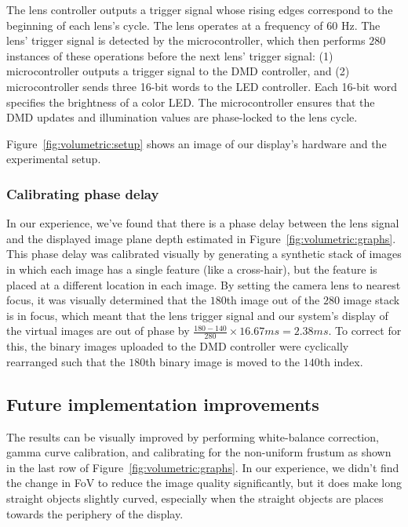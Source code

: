 The lens controller outputs a trigger signal whose rising edges correspond to the beginning of each lens's cycle. The lens operates at a frequency of 60 Hz. The lens' trigger signal is detected by the microcontroller, which then performs $280$ instances of these operations before the next lens' trigger signal: (1) microcontroller outputs a trigger signal to the DMD controller, and (2) microcontroller sends three 16-bit words to the LED controller. Each 16-bit word specifies the brightness of a color LED. The microcontroller ensures that the DMD updates and illumination values are phase-locked to the lens cycle. 

Figure~\ref{fig:volumetric:setup} shows an image of our display's hardware and the experimental setup. 

\subsubsection{Calibrating phase delay}
In our experience, we've found that there is a phase delay between the lens signal and the displayed image plane depth estimated in Figure~\ref{fig:volumetric:graphs}. This phase delay was calibrated visually by generating a synthetic stack of images in which each image has a single feature (like a cross-hair), but the feature is placed at a different location in each image. By setting the camera lens to nearest focus, it was visually determined that the $180$th image out of the $280$ image stack is in focus, which meant that the lens trigger signal and our system's display of the virtual images are out of phase by $\frac{180 - 140}{280} \times 16.67ms = 2.38 ms$. To correct for this, the binary images uploaded to the DMD controller were cyclically rearranged such that the $180$th binary image is moved to the $140$th index.

\subsection{Future implementation improvements}
The results can be visually improved by performing white-balance correction, gamma curve calibration, and calibrating for the non-uniform frustum as shown in the last row of Figure~\ref{fig:volumetric:graphs}. In our experience, we didn't find the change in FoV to reduce the image quality significantly, but it does make long straight objects slightly curved, especially when the straight objects are places towards the periphery of the display. 

